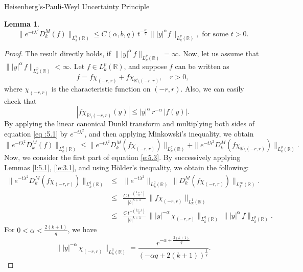\documentclass[12pt,a4paper,reqno]{amsproc}
\newtheorem{lemma}[theorem]{Lemma}
\theoremstyle{definition}
\theoremstyle{remark}
\numberwithin{equation}{section}
\begin{document}
\begin{subsection}{Heisenberg's-Pauli-Weyl Uncertainty Principle}
\begin{lemma}
    \begin{equation*}
\|e^{-t\lambda ^2}  D_k^M(f)\|_{{L_k^{q}(\mathbb{R})}} \le C(\alpha,b,q)\, t^{-\frac{\alpha}{2}}\, \| |y|^\alpha f\|_{{L^p_k(\mathbb{R})} }, \,\, \text{for some} \,\, t>0.    
    \end{equation*}
\end{lemma}
\begin{proof}
The result directly holds, if $\||y|^\alpha\,f\|_{L_k^p(\mathbb{R})} =\infty$. Now, let us assume that $\||y|^{\alpha}\, f\|_{L_k^p(\mathbb{R})}<\infty.$
Let $f\in L^p_k(\mathbb{R})$, and suppose $f$ can be written as 
\begin{equation} \label{eq :5.1}
f = f \chi_{(-r,r)}+f \chi_{\mathbb{R}\setminus(-r,r)}, \quad r>0,
\end{equation}
where $\chi_{(-r,r)}$ is the characteristic function on $(-r,r)$.
Also, we can easily check that
\begin{equation}\label{5.1}
 |f \chi_{{\mathbb{R}}\setminus(-r,r)}(y)|\le |y|^\alpha\,r^{-\alpha}\,|f(y)|.   
\end{equation}
By applying the linear canonical Dunkl transform and multiplying both sides of equation \eqref{eq :5.1} by $e^{-t\lambda^2}$, and then applying Minkowski's inequality, we obtain
\begin{equation}\label{e:5.3}
    \|e^{-t\lambda^2}D_k^M(f)\|_{L_k^q(\mathbb{R})} \le \|e^{-t\lambda^2} D_k^M\left(f\chi_{(-r,r)}\right)\|_{L_k^{q}(\mathbb{R})}+\|e^{-t\lambda^2}D_k^M\left(f\chi_{\mathbb{R}\setminus(-r,r)}\right)\|_{L_k^{q}(\mathbb{R})}.
\end{equation}
Now, we consider the first part of equation \eqref{e:5.3}. By successively applying Lemmas \ref{l:5.1}, \ref{le:3.1}, and using H\"older's inequality, we obtain the following:
\begin{eqnarray*}
\|e^{-t\lambda^2} D_k^M\left(f\chi_{(-r,r)}\right) \|_{L_k^{q}(\mathbb{R})} &\le& \|e^{-t\lambda^2}\|_{L_k^{q}(\mathbb{R})}\, \| D_k^M\left(f\chi_{(-r,r)}\right)\|_{L_k^{\infty}(\mathbb{R})}.\\
&\le&  \frac{C\, t^{-\left(\frac{k+1}{q}\right)}}{|b|^{k+1}}\, \|f\chi_{(-r,r)}\|_{L_k^1(\mathbb{R})}\\
     &\le& \frac{C\, t^{-\left(\frac{k+1}{q}\right)}}{|b|^{k+1}}\, \||y|^{-\alpha} \,\chi_{(-r,r)}\|_{L_k^{q}(\mathbb{R})}\, \||y|^\alpha\,f\|_{L_k^{p}(\mathbb{R})}.
 \end{eqnarray*}
For $0<\alpha<\frac{2(k+1)}{q}$, we have
\begin{equation*}\label{e:5.6}
     \||y|^{-\alpha}\,\chi_{(-r,r)}\|_{L_k^{q}(\mathbb{R})} = \frac{r^{-\alpha+\frac{2(k+1)}{q}}}{(-\alpha q+2(k+1))^{\frac{1}{q}}}.

\end{equation*}
\end{proof}
\end{subsection}
\end{document}
